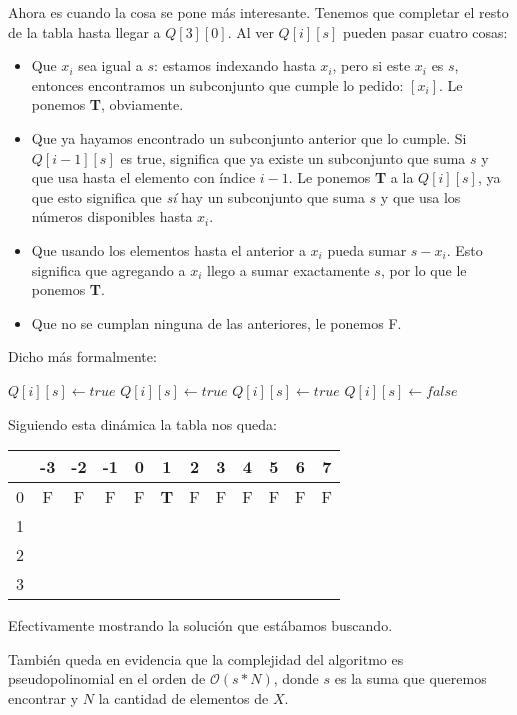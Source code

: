 \newpage
Ahora es cuando la cosa se pone m\'as interesante. Tenemos que completar el resto de la tabla hasta llegar a $Q[3][0]$. Al ver $Q[i][s]$ pueden pasar cuatro cosas:

\begin{itemize}
\item Que $x_i$ sea igual a $s$: estamos indexando hasta $x_i$, pero si este $x_i$ es $s$, entonces encontramos un subconjunto que cumple lo pedido: $[x_i]$. Le ponemos \textbf{T}, obviamente.
\item Que ya hayamos encontrado un subconjunto anterior que lo cumple. Si $Q[i-1][s]$ es true, significa que ya existe un subconjunto que suma $s$ y que usa hasta el elemento con \'indice $i-1$. Le ponemos \textbf{T} a la $Q[i][s]$, ya que esto significa que \emph{s\'i} hay un subconjunto que suma $s$ y que usa los n\'umeros disponibles hasta $x_i$.
\item Que usando los elementos hasta el anterior a $x_i$ pueda sumar $s-x_i$. Esto significa que agregando a $x_i$ llego a sumar exactamente $s$, por lo que le ponemos \textbf{T}.
\item Que no se cumplan ninguna de las anteriores, le ponemos F.
\end{itemize}

Dicho m\'as formalmente:

\begin{algorithm}
\begin{algorithmic}[1]
      \State $Q[i][s] \gets true$
      \State $Q[i][s] \gets true$
      \State $Q[i][s] \gets true$
    \Else
      \State $Q[i][s] \gets false$
    \EndIf
  \EndFor
\EndFor
\end{algorithmic}
\end{algorithm}

Siguiendo esta din\'amica la tabla nos queda:

\begin{center}
  \begin{tabular}{ | c | c | c | c | c | c | c | c | c | c | c | c | }
    \hline
      & -3 & -2 & -1 & 0 & 1 & 2 & 3 & 4 & 5 & 6 & 7 \\ \hline
    0 &  F & F  &  F & F & \textbf{T}  & F  &  F & F  & F  & F  & F  \\ \hline
    1 &    &    &    &   &   &   &   &   &   &   &   \\ \hline
    2 &    &    &    &   &   &   &   &   &   &   &   \\ \hline
    3 &    &    &    &   &   &   &   &   &   &   &   \\ \hline
  \end{tabular}
\end{center}

Efectivamente mostrando la soluci\'on que est\'abamos buscando.

Tambi\'en queda en evidencia que la complejidad del algoritmo es pseudopolinomial en el orden de $\mathcal{O}(s*N)$, donde $s$ es la suma que queremos encontrar y $N$ la cantidad de elementos de $X$.